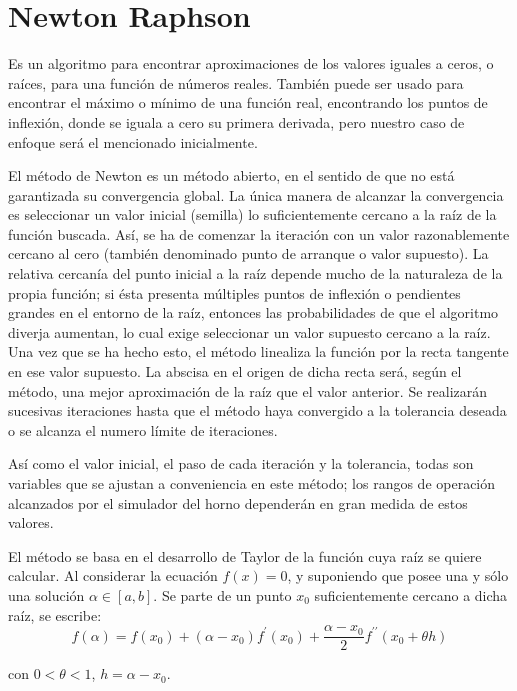 \section{Newton Raphson}
\par Es un algoritmo para encontrar aproximaciones de los valores iguales a ceros, o raíces, para una función de números reales. También puede ser usado para encontrar el máximo o mínimo de una función real, encontrando los puntos de inflexión, donde se iguala a cero su primera derivada, pero nuestro caso de enfoque será el mencionado inicialmente.
\par El método de Newton es un método abierto, en el sentido de que no está garantizada su convergencia global. La única manera de alcanzar la convergencia es seleccionar un valor inicial (semilla) lo suficientemente cercano a la raíz de la función buscada. Así, se ha de comenzar la iteración con un valor razonablemente cercano al cero (también denominado punto de arranque o valor supuesto). La relativa cercanía del punto inicial a la raíz depende mucho de la naturaleza de la propia función; si ésta presenta múltiples puntos de inflexión o pendientes grandes en el entorno de la raíz, entonces las probabilidades de que el algoritmo diverja aumentan, lo cual exige seleccionar un valor supuesto cercano a la raíz. Una vez que se ha hecho esto, el método linealiza la función por la recta tangente en ese valor supuesto. La abscisa en el origen de dicha recta será, según el método, una mejor aproximación de la raíz que el valor anterior. Se realizarán sucesivas iteraciones hasta que el método haya convergido a la tolerancia deseada o se alcanza el numero límite de iteraciones. 
\par Así como el valor inicial, el paso de cada iteración y la tolerancia, todas son variables que se ajustan a conveniencia en este método; los rangos de operación alcanzados por el simulador del horno dependerán en gran medida de estos valores.
\par El método se basa en el desarrollo de Taylor de la función cuya raíz se quiere calcular. Al considerar la ecuación $f(x)=0$, y suponiendo que posee una y sólo una solución $\alpha\in[a,b]$. Se parte de un punto $x_0$ suficientemente cercano a dicha raíz, se escribe:
\begin{equation*}
f(\alpha) = f(x_0)
    + (\alpha-x_0)f^\prime(x_0) 
    + \frac{\alpha-x_0}{2}f^{\prime\prime}(x_0+\theta h)
\end{equation*}
\par con $0<\theta<1$, $h=\alpha-x_0$.

